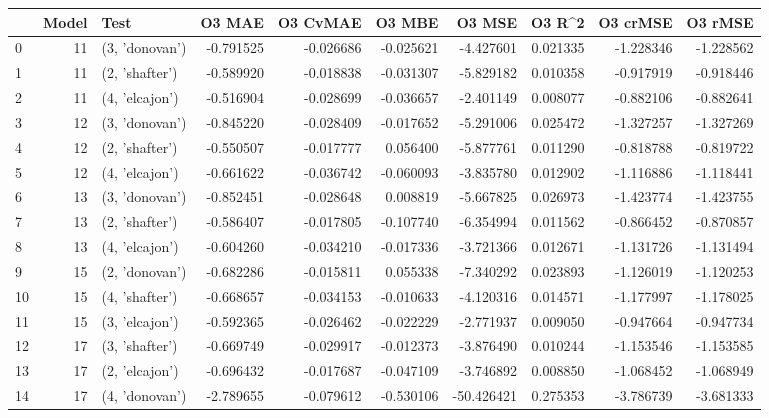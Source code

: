 \begin{tabular}{lrlrrrrrrr}
\toprule
{} &  Model &            Test &    O3 MAE &  O3 CvMAE &    O3 MBE &     O3 MSE &    O3 R\textasciicircum2 &  O3 crMSE &   O3 rMSE \\
\midrule
0  &     11 &  (3, 'donovan') & -0.791525 & -0.026686 & -0.025621 &  -4.427601 &  0.021335 & -1.228346 & -1.228562 \\
1  &     11 &  (2, 'shafter') & -0.589920 & -0.018838 & -0.031307 &  -5.829182 &  0.010358 & -0.917919 & -0.918446 \\
2  &     11 &  (4, 'elcajon') & -0.516904 & -0.028699 & -0.036657 &  -2.401149 &  0.008077 & -0.882106 & -0.882641 \\
3  &     12 &  (3, 'donovan') & -0.845220 & -0.028409 & -0.017652 &  -5.291006 &  0.025472 & -1.327257 & -1.327269 \\
4  &     12 &  (2, 'shafter') & -0.550507 & -0.017777 &  0.056400 &  -5.877761 &  0.011290 & -0.818788 & -0.819722 \\
5  &     12 &  (4, 'elcajon') & -0.661622 & -0.036742 & -0.060093 &  -3.835780 &  0.012902 & -1.116886 & -1.118441 \\
6  &     13 &  (3, 'donovan') & -0.852451 & -0.028648 &  0.008819 &  -5.667825 &  0.026973 & -1.423774 & -1.423755 \\
7  &     13 &  (2, 'shafter') & -0.586407 & -0.017805 & -0.107740 &  -6.354994 &  0.011562 & -0.866452 & -0.870857 \\
8  &     13 &  (4, 'elcajon') & -0.604260 & -0.034210 & -0.017336 &  -3.721366 &  0.012671 & -1.131726 & -1.131494 \\
9  &     15 &  (2, 'donovan') & -0.682286 & -0.015811 &  0.055338 &  -7.340292 &  0.023893 & -1.126019 & -1.120253 \\
10 &     15 &  (4, 'shafter') & -0.668657 & -0.034153 & -0.010633 &  -4.120316 &  0.014571 & -1.177997 & -1.178025 \\
11 &     15 &  (3, 'elcajon') & -0.592365 & -0.026462 & -0.022229 &  -2.771937 &  0.009050 & -0.947664 & -0.947734 \\
12 &     17 &  (3, 'shafter') & -0.669749 & -0.029917 & -0.012373 &  -3.876490 &  0.010244 & -1.153546 & -1.153585 \\
13 &     17 &  (2, 'elcajon') & -0.696432 & -0.017687 & -0.047109 &  -3.746892 &  0.008850 & -1.068452 & -1.068949 \\
14 &     17 &  (4, 'donovan') & -2.789655 & -0.079612 & -0.530106 & -50.426421 &  0.275353 & -3.786739 & -3.681333 \\

\end{tabular}
